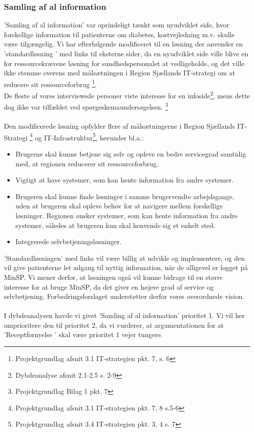 \subsubsection{Samling af al information}
'Samling af al information' var oprindeligt tænkt som nyudviklet side, hvor forskellige information til patienterne om diabetes, kostvejledning m.v. skulle være tilgængelig. Vi har efterfølgende modificeret til en løsning der anvender en ’standardløsning ’ med links til eksterne sider, da en nyudviklet side ville blive en for ressourcekrævene løsning for sundhedspersonalet at vedligeholde, og det ville ikke stemme overens med målsætningen i Region Sjællands IT-strategi om at reducere sit ressourceforbrug \footnote{Projektgrundlag afsnit 3.1 IT-strategien pkt. 7, s. 6}.\\
De fleste af vores interviewede personer viste interesse for en infoside\footnote{Dybdeanalyse afsnit 2.1-2.5 s. 2-9}, mens dette dog ikke var tilfældet ved spørgeskemaundersøgelsen. \footnote{Projektgrundlag Bilag 1 pkt. 7}\\
\\
Den modificerede løsning opfylder flere af målsætningerne i Region Sjællands IT-Strategi \footnote{Projektgrundlag afsnit 3.1 IT-strategien pkt. 7, 8  s.5-6} og IT-Infrastruktur\footnote{Projektgrundlag afsnit 3.4 IT-strategien pkt. 3, 4 s. 7}, herunder bl.a.: 
\begin{itemize}
\item Brugerne skal kunne betjene sig selv og opleve en bedre servicegrad samtidig med, at regionen reducerer sit ressourceforbrug.
\item Vigtigt at have systemer, som kan hente information fra andre systemer. 
\item Brugeren skal kunne finde løsninger i samme brugervendte arbejdsgange, uden at brugeren skal opleve behov for at navigere mellem forskellige løsninger. Regionen ønsker systemer, som kan hente information fra andre systemer, således at brugeren kun skal henvende sig et enkelt sted.
\item Integrerede selvbetjeningsløsninger.
\end{itemize}
'Standardløsningen' med links vil være billig at udvikle og implementere, og den vil give patienterne let adgang til nyttig information, når de alligevel er logget på MinSP. Vi mener derfor, at løsningen også vil kunne bidrage til en større interesse for at bruge MinSP, da det giver en højere grad af service og selvbetjening. Forbedringsforslaget understøtter derfor vores overordnede vision.\\
\\
I dybdeanalysen havde vi givet ’Samling af al information’ prioritet 1. Vi vil her omprioritere den til prioritet 2, da vi vurderer, at argumentationen for at ’Receptfornyelse ’ skal være prioritet 1 vejer tungere.
